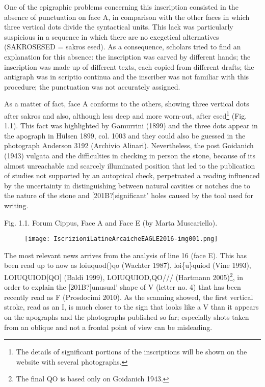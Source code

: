 \documentclass[amsthm,ebook]{saparticle}
\begin{document}
One of the epigraphic problems concerning this inscription consisted in the absence of punctuation on face A, in
comparison with the other faces in which three vertical dots divide the syntactical units. This lack was particularly
suspicious in a sequence in which there are no exegetical alternatives (SAKROSESED = sakros esed). As a consequence,
scholars tried to find an explanation for this absence: the inscription was carved by different hands; the inscription
was made up of different texts, each copied from different drafts; the antigraph was in scriptio continua and the
inscriber was not familiar with this procedure; the punctuation was not accurately assigned.

As a matter of fact, face A conforms to the others, showing three vertical dots after sakros and also, although less
deep and more worn-out, after esed\footnote{The details of significant portions of the inscriptions will be shown on
the website with several photographs. } (Fig. 1.1). This fact was highlighted by Gamurrini (1899) and the three dots
appear in the apograph in Hülsen 1899, col. 1003 and they could also be guessed in the photograph Anderson 3192
(Archivio Alinari). Nevertheless, the post Goidanich (1943) vulgata and the difficulties in checking in person the
stone, because of its almost unreachable and scarcely illuminated position that led to the publication of studies not
supported by an autoptical check, perpetuated a reading influenced by the uncertainty in distinguishing between natural
cavities or notches due to the nature of the stone and [201B?]significant’ holes caused by the tool used for writing. 

Fig. 1.1. Forum Cippus, Face A and Face E (by Marta Muscariello). 

\begin{figure}
\centering
\texttt{[image: IscrizioniLatineArcaicheEAGLE2016-img001.png]}
\end{figure}

\bigskip

The most relevant news arrives from the analysis of line 16 (face E). This has been read up to now as loiuquod()qo
(Wachter 1987), loi\{u\}quiod (Vine 1993), LOIUQUIOD[QO] (Baldi 1999), LOIUQUIOD,QO/// (Hartmann 2005)\footnote{The
final QO is based only on Goidanich 1943.}, in order to explain the [201B?]unusual’ shape of V (letter no. 4) that has
been recently read as F (Prosdocimi 2010). As the scanning showed, the first vertical stroke, read as an I, is much
closer to the sign that looks like a V than it appears on the apographs and the photographs published so far;
especially shots taken from an oblique and not a frontal point of view can be misleading. 
\end{document}
